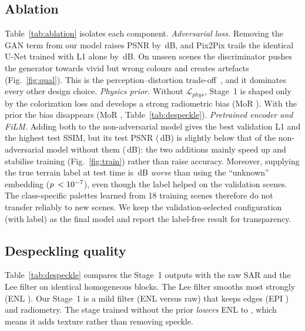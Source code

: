 \documentclass[conference]{IEEEtran}
\begin{document}
\subsection{Ablation}\label{sec:ablation}
Table~\ref{tab:ablation} isolates each component.
\emph{Adversarial loss.} Removing the GAN term from our model raises PSNR by \dGanCost{}\,dB, and Pix2Pix trails the identical
U-Net trained with L1 alone by \dPixVsUnet{}\,dB. On unseen scenes the discriminator pushes the generator towards vivid but wrong
colours and creates artefacts (Fig.~\ref{fig:qual}). This is the perception--distortion trade-off~\cite{blau2018perception},
and it dominates every other design choice.
\emph{Physics prior.} Without $\mathcal{L}_{phys}$, Stage~1 is shaped only by the colorization loss and develops a strong radiometric
bias (MoR \morOursNophys). With the prior the bias disappears (MoR \morOurs, Table~\ref{tab:despeckle}).
\emph{Pretrained encoder and FiLM.} Adding both to the non-adversarial model gives the best validation L1 and the highest test
SSIM, but its test PSNR (\psnrOursRBICondNoadv{}\,dB) is slightly below that of the non-adversarial model without them
(\psnrOursNoadv{}\,dB): the two additions mainly speed up and stabilise training (Fig.~\ref{fig:train}) rather than raise
accuracy. Moreover, supplying the true terrain label at test time is \dNoLabelVsFinal{}\,dB \emph{worse} than using the ``unknown''
embedding ($p\,<10^{-7}$), even though the label helped on the validation scenes. The class-specific palettes learned from
18 training scenes therefore do not transfer reliably to new scenes. We keep the validation-selected configuration (with label)
as the final model and report the label-free result for transparency.

\begin{table}[t]
\caption{Ablation (test set). S1: despeckling stage; $\mathcal{L}_{phys}$: physics prior; $\mathcal{L}_{s,g}$: SSIM and gradient
losses; R18: pretrained ResNet-18 encoder; FiLM: terrain conditioning. MoR: mean of ratio of the Stage~1 output (ideal 1).}
\label{tab:ablation}
\centering\footnotesize

\end{table}

\subsection{Despeckling quality}
Table~\ref{tab:despeckle} compares the Stage~1 outputs with the raw SAR and the Lee filter on identical homogeneous blocks. The
Lee filter smooths most strongly (ENL \enlLee). Our Stage~1 is a mild filter (ENL \enlOursRBICondNoadv{} versus \enlRaw{} raw)
that keeps edges (EPI \epiOursRBICondNoadv) and radiometry. The stage trained without the prior \emph{lowers} ENL to \enlOursNophys, which
means it adds texture rather than removing speckle.
\end{document}
